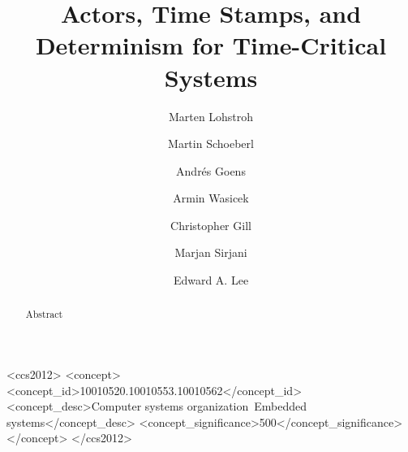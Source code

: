 \documentclass[sigconf]{acmart}
\begin{document}
\title{Actors, Time Stamps, and Determinism for Time-Critical Systems}


\author{Marten Lohstroh}


\author{Martin Schoeberl}

\author{Andr\'es Goens}
\orcid{}

\author{Armin Wasicek}
\orcid{}

\author{Christopher Gill}
\orcid{}


\author{Marjan Sirjani}
\orcid{}


\author{Edward A. Lee}



\renewcommand{\shortauthors}{E. A. Lee et al.}

\begin{abstract}
Abstract
\end{abstract}

%
%
\begin{CCSXML}
	<ccs2012>
	<concept>
	<concept_id>10010520.10010553.10010562</concept_id>
	<concept_desc>Computer systems organization~Embedded systems</concept_desc>
	<concept_significance>500</concept_significance>
	</concept>
	</ccs2012>  
\end{CCSXML}
\end{document}
